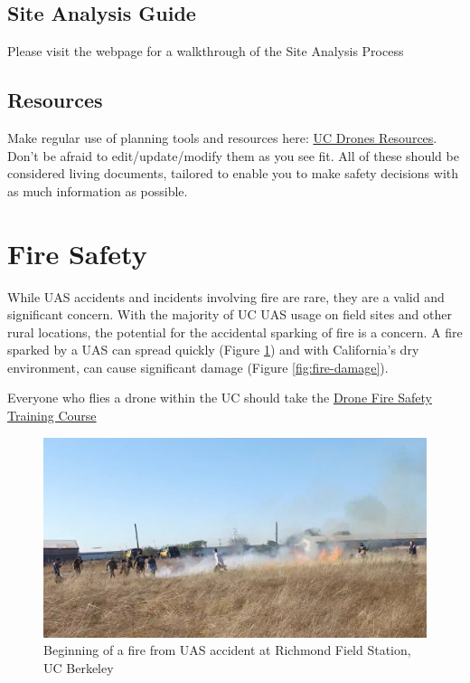 \documentclass[
  12pt,
]{book}
\begin{document}
\hypertarget{site-analysis-guide}{%
\subsection{Site Analysis Guide}\label{site-analysis-guide}}

Please visit the webpage for a walkthrough of the Site Analysis Process

\hypertarget{resources}{%
\subsection{Resources}\label{resources}}

Make regular use of planning tools and resources here: \href{https://ucdrones.github.io/ch-resources.html}{UC Drones Resources}. Don't be afraid to edit/update/modify them as you see fit. All of these should be considered living documents, tailored to enable you to make safety decisions with as much information as possible.

\hypertarget{fire-safety}{%
\section{Fire Safety}\label{fire-safety}}

While UAS accidents and incidents involving fire are rare, they are a valid and significant concern. With the majority of UC UAS usage on field sites and other rural locations, the potential for the accidental sparking of fire is a concern. A fire sparked by a UAS can spread quickly (Figure \ref{fig:fire-start}) and with California's dry environment, can cause significant damage (Figure \ref{fig:fire-damage}).

Everyone who flies a drone within the UC should take the \href{https://ucdrones.github.io/library/trainings/FireSafety/index.html}{Drone Fire Safety Training Course}

\begin{figure}

{\centering \includegraphics[width=0.75\linewidth]{images/fire_start} 

}

\caption{Beginning of a fire from UAS accident at Richmond Field Station, UC Berkeley}\label{fig:fire-start}
\end{figure}
\end{document}
